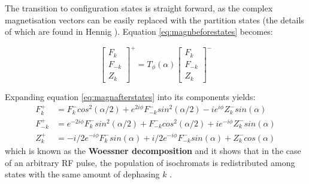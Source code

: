 \hfill


The transition to configuration states is straight forward, as the complex magnetisation vectors can be easily replaced with the partition states (the details of which are found in Hennig \cite{Hennig1991}).
Equation \ref{eq:magnbeforestates} becomes:

\begin{equation}\label{eq:magnafterstates}
    \begin{bmatrix} 
    F_{k} \\
    F_{-k} \\
    Z_{k}
    \end{bmatrix}^+ = 
        T_{\phi}(\alpha)
    \begin{bmatrix} 
    F_{k} \\
    F_{-k} \\
    Z_{k}
    \end{bmatrix}^-
\end{equation}

\hfill 

Expanding equation \ref{eq:magnafterstates} into its components yields:
\begin{equation}\label{eq:woessner}
\begin{split}
    F_{k}^+ &= F_{k}^- cos^2(\alpha/2) + e^{2i\phi} F_{-k}^- sin^2(\alpha/2)  - i e^{i \phi} Z_{k}^- sin(\alpha)  \\
    F_{-k}^+ &=  e^{-2i\phi} F_{k}^- sin^2(\alpha/2) + F_{-k}^- cos^2(\alpha/2) + i e^{-i \phi} Z_{k}^- sin(\alpha) \\
    Z_{k}^+ &= - i/2 e^{-i \phi} F_{k}^- sin(\alpha) + i/2 e^{-i \phi} F_{-k}^- sin(\alpha) + Z_{k}^- cos(\alpha) 
\end{split}
\end{equation}
which is known as the \textbf{Woessner decomposition} and it shows that in the case of an arbitrary RF pulse, the population of isochromats is redistributed among states with the same amount of dephasing $k$ \cite{Hennig1991}.

